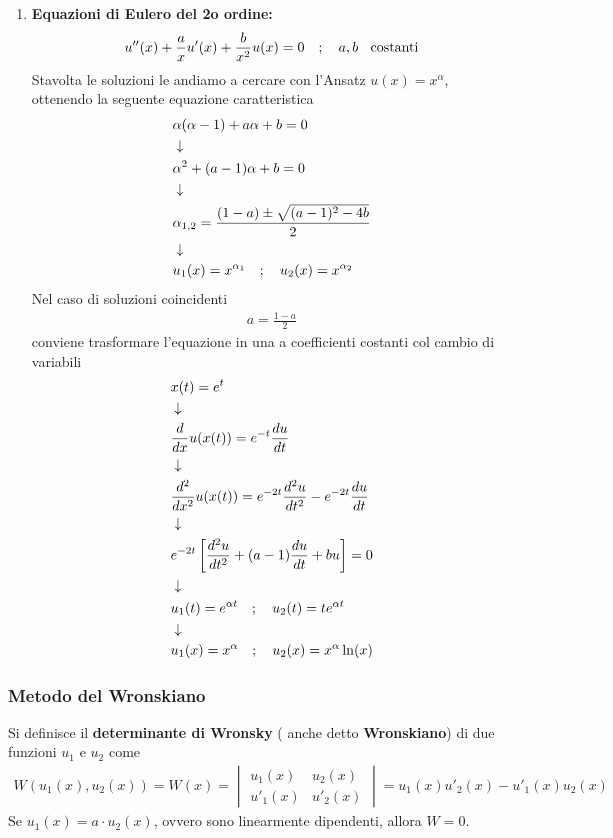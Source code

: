 \begin{enumerate}
	\item \textbf{Equazioni di Eulero del 2o ordine:}
	\begin{align}
		u''(x) + \frac{a}{x}u'(x) + \frac{b}{x^2}u(x) = 0 \quad ; \quad a,b \;\;\ \text{costanti}
	\end{align}
	Stavolta le soluzioni le andiamo a cercare con l'Ansatz $u(x) = x^\alpha$, ottenendo la seguente equazione caratteristica
	\begin{align}
		&\alpha (\alpha - 1) + a\alpha + b = 0 \\ &\downarrow \nonumber \\
		&\alpha^2 + (a-1)\alpha + b = 0 \nonumber \\ &\downarrow \nonumber \\
		&\alpha_{1,2} = \frac{(1-a) \pm \sqrt{(a-1)^2 - 4b}}{2} \\ &\downarrow \nonumber \\
		&u_1 (x) = x^{\alpha_1} \quad ; \quad u_2 (x) = x^{\alpha_2}
	\end{align}
	Nel caso di soluzioni coincidenti
	\begin{align}
		a = \frac{1-a}{2}
	\end{align}
	conviene trasformare l'equazione in una a coefficienti costanti col cambio di variabili
	\begin{align}
		&x(t) = e^t\\ &\downarrow \nonumber \\
		&\frac{d}{dx}u(x(t)) =e^{-t} \frac{du}{dt} \nonumber \\ &\downarrow \nonumber \\
		&\frac{d^2}{dx^2}u(x(t)) =e^{-2t} \frac{d^2u}{dt^2} - e^{-2t} \frac{du}{dt} \nonumber \\ &\downarrow \nonumber \\
		&e^{-2t} \left[ \frac{d^2u}{dt^2} + (a-1)\frac{du}{dt} + bu \right] = 0 \nonumber \\ &\downarrow \nonumber \\
		&u_1(t) = e^{\alpha t} \quad ; \quad u_2(t) = te^{\alpha t} \nonumber \\ &\downarrow \nonumber \\
		&u_1(x) = x^\alpha \quad ; \quad u_2(x) = x^\alpha \ln(x)
	\end{align}
\end{enumerate}

\newpage

\subsubsection{Metodo del Wronskiano}

Si definisce il \textbf{determinante di Wronsky} ( anche detto \textbf{Wronskiano}) di due funzioni $u_1$ e $u_2$ come
\begin{align}
	W(u_1(x),u_2(x)) = W(x) = \begin{vmatrix}
		u_1(x) & u_2(x) \\
		u'_1(x) &u'_2(x)
	\end{vmatrix} = u_1(x) u'_2(x) - u'_1(x) u_2(x) 
\end{align}
Se  $u_1(x)= a\cdot u_2(x)$, ovvero sono linearmente dipendenti, allora $W=0$.

